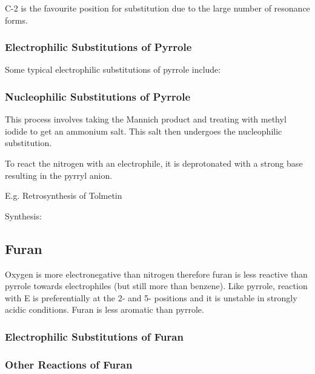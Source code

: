C-2 is the favourite position for substitution due to the large number of resonance forms.


\subsubsection{Electrophilic Substitutions of Pyrrole}

Some typical electrophilic substitutions of pyrrole include:


\subsubsection{Nucleophilic Substitutions of Pyrrole}

This process involves taking the Mannich product and treating with methyl iodide to get an ammonium salt. This salt then undergoes the nucleophilic substitution.


To react the nitrogen with an electrophile, it is deprotonated with a strong base resulting in the pyrryl anion.


E.g. Retrosynthesis of Tolmetin


Synthesis:


\subsection{Furan}


Oxygen is more electronegative than nitrogen therefore furan is less reactive than pyrrole towards electrophiles (but still more than benzene).
Like pyrrole, reaction with E\super{+} is preferentially at the 2- and 5- positions and it is unstable in strongly acidic conditions.
Furan is less aromatic than pyrrole.

\subsubsection{Electrophilic Substitutions of Furan}


\subsubsection{Other Reactions of Furan}

